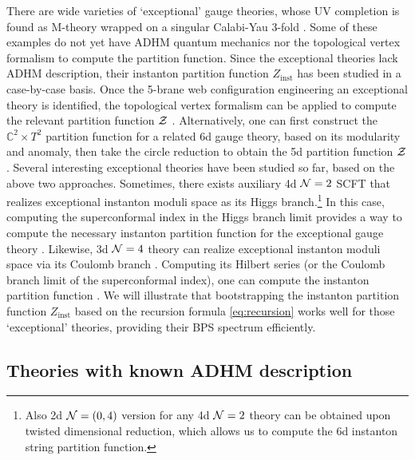 \documentclass[letterpaper, 11pt]{article}
\def\IC{\mathbb{C}}
\def\CN{{\cal N}}
\def\CZ{{\cal Z}}
\begin{document}
{There are wide varieties of `exceptional' gauge theories, whose UV completion is found as M-theory wrapped on a singular Calabi-Yau 3-fold \cite{Diaconescu:1998cn, Jefferson:2018irk, Bhardwaj:2018yhy, Apruzzi:2019opn}. Some of these examples do not yet have ADHM quantum mechanics nor the topological vertex formalism to compute the partition function. 
Since the exceptional theories lack ADHM description, their instanton partition function $Z_\text{inst}$ has been studied in a case-by-case basis. Once the 5-brane web configuration engineering an exceptional theory is identified, the topological vertex formalism can be applied to compute the relevant partition function $\CZ$ \cite{Hollowood:2003cv, Iqbal:2007ii}. 
Alternatively, one can first construct the $\IC^2 \times T^2$ partition function for a related 6d gauge theory, based on its modularity and anomaly, then take the circle reduction to obtain the 5d partition function $\CZ$ \cite{DelZotto:2016pvm, DelZotto:2018tcj}. Several interesting exceptional theories have been studied so far, based on the above two approaches.
Sometimes, there exists auxiliary 4d $\CN=2$ SCFT \cite{Benini:2009gi} that realizes exceptional instanton moduli space as its Higgs branch.\footnote{Also 2d $\CN=(0, 4)$ version \cite{Putrov:2015jpa} for any 4d $\CN=2$ theory can be obtained upon twisted dimensional reduction, which allows us to compute the 6d instanton string partition function.} In this case, computing the superconformal index in the Higgs branch limit provides a way to compute the necessary instanton partition function for the exceptional gauge theory \cite{Gadde:2010te, Gadde:2011uv, Gaiotto:2012uq, Gadde:2015xta, Agarwal:2018ejn}. 
Likewise, 3d $\CN=4$ theory can realize exceptional instanton moduli space via its Coulomb branch \cite{Intriligator:1996ex}. Computing its Hilbert series (or the Coulomb branch limit of the superconformal index), one can compute the instanton partition function \cite{Cremonesi:2013lqa, Cremonesi:2014xha}. 
We will illustrate that bootstrapping the instanton partition function $Z_{\text{inst}}$ based on the recursion formula \eqref{eq:recursion} works well for those `exceptional' theories, providing their BPS spectrum efficiently.



\subsection{Theories with known ADHM description}
\label{subsec:ex-adhm}

}
\end{document}
